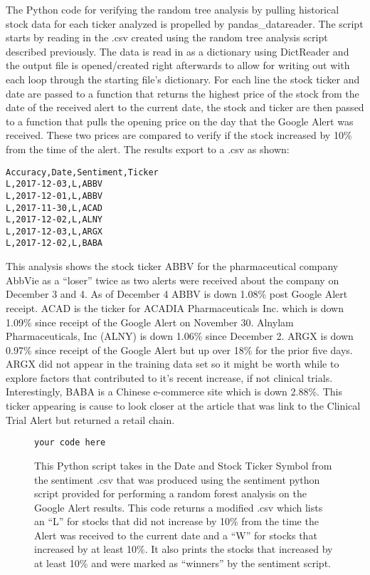 \documentclass[sigconf]{acmart}
\begin{document}
The Python code for verifying the random tree analysis by pulling historical stock data for each ticker analyzed is propelled by pandas\_datareader. The script starts by reading in the .csv created using the random tree analysis script described previously. The data is read in as a dictionary using DictReader and the output file is opened/created right afterwards to allow for writing out with each loop through the starting file's dictionary. For each line the stock ticker and date are passed to a function that returns the highest price of the stock from the date of the received alert to the current date, the stock and ticker are then passed to a function that pulls the opening price on the day that the Google Alert was received. These two prices are compared to verify if the stock increased by 10\% from the time of the alert. The results export to a .csv as shown:
\begin{mdframed}[style=default]
\begin{lstlisting}
Accuracy,Date,Sentiment,Ticker
L,2017-12-03,L,ABBV
L,2017-12-01,L,ABBV
L,2017-11-30,L,ACAD
L,2017-12-02,L,ALNY
L,2017-12-03,L,ARGX
L,2017-12-02,L,BABA
\end{lstlisting}
\end{mdframed}
This analysis shows the stock ticker ABBV for the pharmaceutical company AbbVie as a ``loser'' twice as two alerts were received about the company on December 3 and 4. As of December 4 ABBV is down 1.08\% post Google Alert receipt. ACAD is the ticker for ACADIA Pharmaceuticals Inc. which is down 1.09\% since receipt of the Google Alert on November 30. Alnylam Pharmaceuticals, Inc (ALNY) is down 1.06\% since December 2. ARGX is down 0.97\% since receipt of the Google Alert but up over 18\% for the prior five days. ARGX did not appear in the training data set so it might be worth while to explore factors that contributed to it's recent increase, if not clinical trials. Interestingly, BABA is a Chinese e-commerce site which is down 2.88\%. This ticker appearing is cause to look closer at the article that was link to the Clinical Trial Alert but returned a retail chain.

\begin{figure}[htb]
\begin{verbatim}
your code here 
\end{verbatim}
\caption{This Python script takes in the Date and Stock Ticker Symbol from the sentiment .csv that was produced using the sentiment python script provided for performing a random forest analysis on the Google Alert results. This code returns a modified .csv which lists an ``L'' for stocks that did not increase by 10\% from the time the Alert was received to the current date and a ``W'' for stocks that increased by at least 10\%. It also prints the stocks that increased by at least 10\%  and were marked as ``winners'' by the sentiment script.}\label{c:result}
\end{figure}
\end{document}
